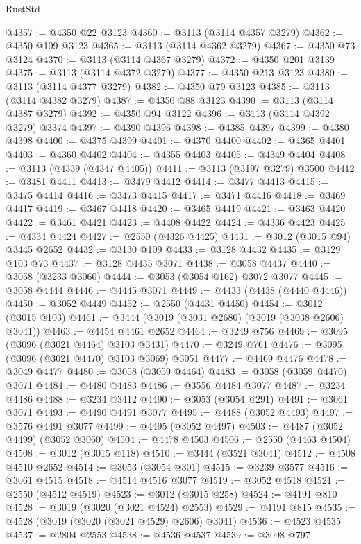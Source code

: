 \begin{lexlean}{RustStd}
\begin{coremodule}
@4357 := @4350 @22 @3123
@4360 := @3113 (@3114 @4357 @3279)
@4362 := @4350 @109 @3123
@4365 := @3113 (@3114 @4362 @3279)
@4367 := @4350 @73 @3124
@4370 := @3113 (@3114 @4367 @3279)
@4372 := @4350 @201 @3139
@4375 := @3113 (@3114 @4372 @3279)
@4377 := @4350 @213 @3123
@4380 := @3113 (@3114 @4377 @3279)
@4382 := @4350 @79 @3123
@4385 := @3113 (@3114 @4382 @3279)
@4387 := @4350 @88 @3123
@4390 := @3113 (@3114 @4387 @3279)
@4392 := @4350 @94 @3122
@4396 := @3113 (@3114 @4392 @3279) @3374
@4397 := @4390 @4396
@4398 := @4385 @4397
@4399 := @4380 @4398
@4400 := @4375 @4399
@4401 := @4370 @4400
@4402 := @4365 @4401
@4403 := @4360 @4402
@4404 := @4355 @4403
@4405 := @4349 @4404
@4408 := @3113 (@4339 (@4347 @4405))
@4411 := @3113 (@3197 @3279) @3500
@4412 := @3481 @4411
@4413 := @3479 @4412
@4414 := @3477 @4413
@4415 := @3475 @4414
@4416 := @3473 @4415
@4417 := @3471 @4416
@4418 := @3469 @4417
@4419 := @3467 @4418
@4420 := @3465 @4419
@4421 := @3463 @4420
@4422 := @3461 @4421
@4423 := @4408 @4422
@4424 := @4336 @4423
@4425 := @4334 @4424
@4427 := @2550 (@4326 @4425)
@4431 := @3012 (@3015 @94) @3445 @2652
@4432 := @3130 @109
@4433 := @3128 @4432
@4435 := @3129 @103 @73
@4437 := @3128 @4435 @3071
@4438 := @3058 @4437
@4440 := @3058 (@3233 @3060)
@4444 := @3053 (@3054 @162) @3072 @3077
@4445 := @3058 @4444
@4446 := @4445 @3071
@4449 := @4433 (@4438 (@4440 @4446))
@4450 := @3052 @4449
@4452 := @2550 (@4431 @4450)
@4454 := @3012 (@3015 @103)
@4461 := @3444 (@3019 (@3031 @2680) (@3019 (@3038 @2606) @3041))
@4463 := @4454 @4461 @2652
@4464 := @3249 @756
@4469 := @3095 (@3096 (@3021 @4464) @3103 @3431)
@4470 := @3249 @761
@4476 := @3095 (@3096 (@3021 @4470) @3103 @3069) @3051
@4477 := @4469 @4476
@4478 := @3049 @4477
@4480 := @3058 (@3059 @4464)
@4483 := @3058 (@3059 @4470) @3071
@4484 := @4480 @4483
@4486 := @3556 @4484 @3077
@4487 := @3234 @4486
@4488 := @3234 @3412
@4490 := @3053 (@3054 @291)
@4491 := @3061 @3071
@4493 := @4490 @4491 @3077
@4495 := @4488 (@3052 @4493)
@4497 := @3576 @4491 @3077
@4499 := @4495 (@3052 @4497)
@4503 := @4487 (@3052 @4499) (@3052 @3060)
@4504 := @4478 @4503
@4506 := @2550 (@4463 @4504)
@4508 := @3012 (@3015 @118)
@4510 := @3444 (@3521 @3041)
@4512 := @4508 @4510 @2652
@4514 := @3053 (@3054 @301)
@4515 := @3239 @3577
@4516 := @3061 @4515
@4518 := @4514 @4516 @3077
@4519 := @3052 @4518
@4521 := @2550 (@4512 @4519)
@4523 := @3012 (@3015 @258)
@4524 := @4191 @810
@4528 := @3019 (@3020 (@3021 @4524) @2553)
@4529 := @4191 @815
@4535 := @4528 (@3019 (@3020 (@3021 @4529) @2606) @3041)
@4536 := @4523 @4535
@4537 := @2804 @2553
@4538 := @4536 @4537
@4539 := @3098 @797

\end{coremodule}
\end{lexlean}
